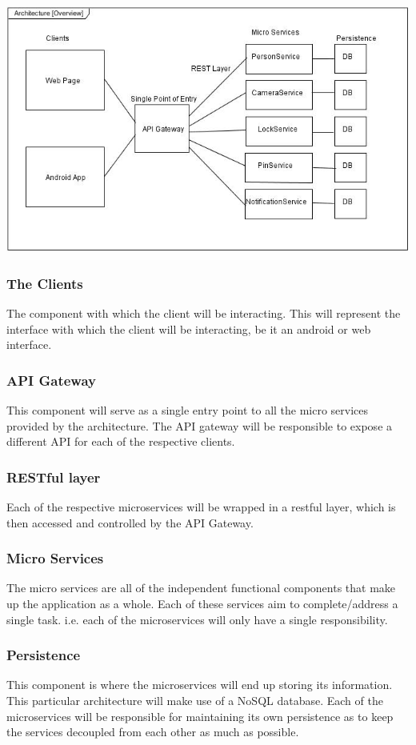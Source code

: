 \documentclass[a4paper,12pt]{article}
\begin{document}
	\includegraphics[width=1\textwidth]{./Pictures/UML/architectureOverview.jpg}\\[1.5cm]
	
	
	\subsubsection{The Clients}
	The component with which the client will be interacting. This will represent the interface with which the client will be interacting, be it an android or web interface.
	\subsubsection{API Gateway}
	This component will serve as a single entry point to all the micro services provided by the architecture. The API gateway will be responsible to expose a different API for each of the respective clients. 
	\subsubsection{RESTful layer}
	Each of the respective microservices will be wrapped in a restful layer, which is then accessed and controlled by the API Gateway. 
	\subsubsection{Micro Services}
	The micro services are all of the independent functional components that make up the application as a whole. Each of these services aim to complete/address a single task. i.e. each of the microservices will only have a single responsibility. 
	\subsubsection{Persistence}
	This component is where the microservices will end up storing its information. This particular architecture will make use of a NoSQL database. Each of the microservices will be responsible for maintaining its own persistence as to keep the services decoupled from each other as much as possible.
	
\end{document}
